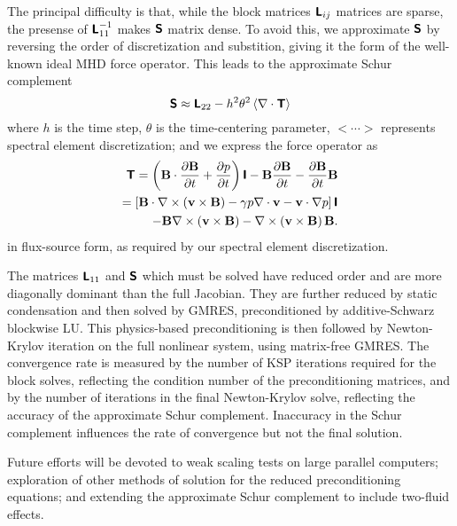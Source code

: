 \documentclass{report}
\begin{document}
The principal difficulty is that, while the block matrices $\hbox{\sffamily\bfseries L}_{ij}$
matrices are sparse, the presense of $\hbox{\sffamily\bfseries L}_{11}^{-1}$ makes $\hbox{\sffamily\bfseries S}$
matrix dense. To avoid this, we approximate $\hbox{\sffamily\bfseries S}$ by reversing the
order of discretization and substition, giving it the form of the
well-known ideal MHD force operator. This leads to the approximate
Schur complement
\begin{equation}
\hbox{\sffamily\bfseries S} \approx \hbox{\sffamily\bfseries L}_{22}
- h^2 \theta^2 \left< \nabla \cdot \hbox{\sffamily\bfseries T} \right>
\nonumber
\end{equation}
where $h$ is the time step, $\theta$ is the time-centering parameter, $<
\cdots >$ represents spectral element discretization; and we express the
force operator as
\begin{eqnarray}
\hbox{\sffamily\bfseries T} = \left( \hbox{\bfseries B} \cdot \frac{\partial \hbox{\bfseries B}}{\partial t}
+ \frac{\partial p}{\partial t} \right) \hbox{\sffamily\bfseries I}
- \hbox{\bfseries B} \frac{\partial \hbox{\bfseries B}}{\partial t}
- \frac{\partial \hbox{\bfseries B}}{\partial t} \hbox{\bfseries B} \nonumber \\
= \left[ \hbox{\bfseries B} \cdot \nabla \times \left(\hbox{\bfseries v} \times \hbox{\bfseries B} \right)
- \gamma p \nabla \cdot \hbox{\bfseries v} - \hbox{\bfseries v} \cdot \nabla p \right]
\hbox{\sffamily\bfseries I} \nonumber \\
- \hbox{\bfseries B} \nabla \times \left(\hbox{\bfseries v} \times \hbox{\bfseries B} \right)
- \nabla \times \left(\hbox{\bfseries v} \times \hbox{\bfseries B} \right) \hbox{\bfseries B}. \nonumber
\nonumber
\end{eqnarray}
in flux-source form, as required by our spectral element discretization.

The matrices $\hbox{\sffamily\bfseries L}_{11}$ and $\hbox{\sffamily\bfseries S}$ which must be solved have reduced
order and are more diagonally dominant than the full Jacobian. They are
further reduced by static condensation and then solved by GMRES,
preconditioned by additive-Schwarz blockwise LU. This physics-based
preconditioning is then followed by Newton-Krylov iteration on the full
nonlinear system, using matrix-free GMRES. The convergence rate is
measured by the number of KSP iterations required for the block solves,
reflecting the condition number of the preconditioning matrices, and by
the number of iterations in the final Newton-Krylov solve, reflecting
the accuracy of the approximate Schur complement. Inaccuracy in the
Schur complement influences the rate of convergence but not the final
solution.

Future efforts will be devoted to weak scaling tests on large parallel
computers; exploration of other methods of solution for the reduced
preconditioning equations; and extending the approximate Schur
complement to include two-fluid effects.
\end{document}
